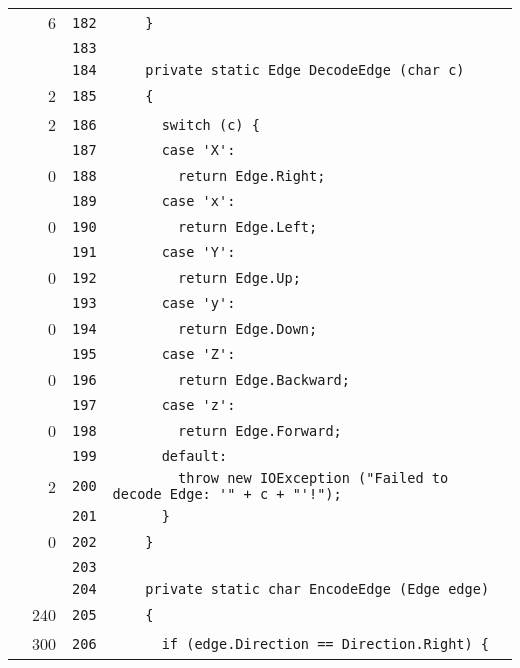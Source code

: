 \documentclass[a4paper,10pt]{article}
\begin{document}
\begin{longtable}[l]{lrrl}
\cellcolor{green} & 6 & \verb~182~ & \verb~    }~\\
\cellcolor{gray} &  & \verb~183~ & \verb~~\\
\cellcolor{gray} &  & \verb~184~ & \verb~    private static Edge DecodeEdge (char c)~\\
\cellcolor{green} & 2 & \verb~185~ & \verb~    {~\\
\cellcolor{green} & 2 & \verb~186~ & \verb~      switch (c) {~\\
\cellcolor{gray} &  & \verb~187~ & \verb~      case 'X':~\\
\cellcolor{red} & 0 & \verb~188~ & \verb~        return Edge.Right;~\\
\cellcolor{gray} &  & \verb~189~ & \verb~      case 'x':~\\
\cellcolor{red} & 0 & \verb~190~ & \verb~        return Edge.Left;~\\
\cellcolor{gray} &  & \verb~191~ & \verb~      case 'Y':~\\
\cellcolor{red} & 0 & \verb~192~ & \verb~        return Edge.Up;~\\
\cellcolor{gray} &  & \verb~193~ & \verb~      case 'y':~\\
\cellcolor{red} & 0 & \verb~194~ & \verb~        return Edge.Down;~\\
\cellcolor{gray} &  & \verb~195~ & \verb~      case 'Z':~\\
\cellcolor{red} & 0 & \verb~196~ & \verb~        return Edge.Backward;~\\
\cellcolor{gray} &  & \verb~197~ & \verb~      case 'z':~\\
\cellcolor{red} & 0 & \verb~198~ & \verb~        return Edge.Forward;~\\
\cellcolor{gray} &  & \verb~199~ & \verb~      default:~\\
\cellcolor{green} & 2 & \verb~200~ & \verb~        throw new IOException ("Failed to decode Edge: '" + c + "'!");~\\
\cellcolor{gray} &  & \verb~201~ & \verb~      }~\\
\cellcolor{red} & 0 & \verb~202~ & \verb~    }~\\
\cellcolor{gray} &  & \verb~203~ & \verb~~\\
\cellcolor{gray} &  & \verb~204~ & \verb~    private static char EncodeEdge (Edge edge)~\\
\cellcolor{green} & 240 & \verb~205~ & \verb~    {~\\
\cellcolor{green} & 300 & \verb~206~ & \verb~      if (edge.Direction == Direction.Right) {~\\

\end{longtable}
\end{document}
